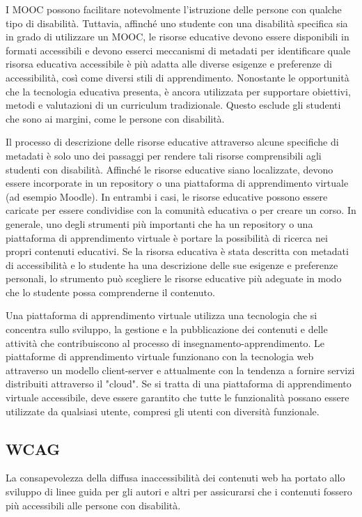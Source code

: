 I MOOC possono facilitare notevolmente l'istruzione delle persone con qualche tipo di disabilità. Tuttavia, affinché uno studente con una disabilità specifica sia in grado di utilizzare un MOOC, le risorse educative devono essere disponibili in formati accessibili e devono esserci meccanismi di metadati per identificare quale risorsa educativa accessibile è più adatta alle diverse esigenze e preferenze di accessibilità, così come diversi stili di apprendimento. Nonostante le opportunità che la tecnologia educativa presenta, è ancora utilizzata per supportare obiettivi, metodi e valutazioni di un curriculum tradizionale. Questo esclude gli studenti che sono ai margini, come le persone con disabilità.

Il processo di descrizione delle risorse educative attraverso alcune specifiche di metadati è solo uno dei passaggi per rendere tali risorse comprensibili agli studenti con disabilità. Affinché le risorse educative siano localizzate, devono essere incorporate in un repository o una piattaforma di apprendimento virtuale (ad esempio Moodle). In entrambi i casi, le risorse educative possono essere caricate per essere condividise con la comunità educativa o per creare un corso. In generale, uno degli strumenti più importanti che ha un repository o una piattaforma di apprendimento virtuale è portare la possibilità di ricerca nei propri contenuti educativi. Se la risorsa educativa è stata descritta con metadati di accessibilità e lo studente ha una descrizione delle sue esigenze e preferenze personali, lo strumento può scegliere le risorse educative più adeguate in modo che lo studente possa comprenderne il contenuto.

Una piattaforma di apprendimento virtuale utilizza una tecnologia che si concentra sullo sviluppo, la gestione e la pubblicazione dei contenuti e delle attività che contribuiscono al processo di insegnamento-apprendimento. Le piattaforme di apprendimento virtuale funzionano con la tecnologia web attraverso un modello client-server e attualmente con la tendenza a fornire servizi distribuiti attraverso il "cloud". Se si tratta di una piattaforma di apprendimento virtuale accessibile, deve essere garantito che tutte le funzionalità possano essere utilizzate da qualsiasi utente, compresi gli utenti con diversità funzionale\cite{edures}.

\subsection{WCAG}
La consapevolezza della diffusa inaccessibilità dei contenuti web ha portato  allo sviluppo di linee guida per gli autori e altri per assicurarsi che i contenuti fossero più accessibili alle persone con disabilità. 


